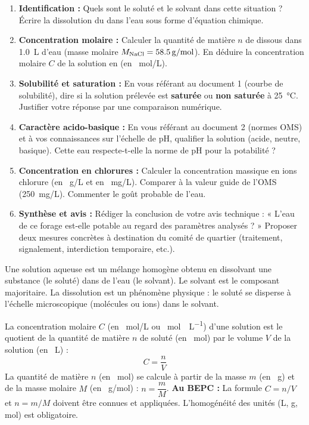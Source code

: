 \documentclass[11pt]{article}
\newcommand{\cle}[1]{{\popxbold\color{popdark}#1}}
\newcounter{popsec}
\newcounter{popsub}
\newcommand{\courssub}[1]{%
  \stepcounter{popsub}%
  \par\vspace{9pt}\noindent{\popxbold\fontsize{11.5}{13}\selectfont\color{popink}{\color{poporange}\thepopsec.\thepopsub}\hspace{6pt}#1}\par\nopagebreak\vspace{4pt}
}
\begin{document}
\begin{enumerate}
    \item \textbf{Identification :} Quels sont le soluté et le solvant dans cette situation ? Écrire la dissolution du  dans l'eau sous forme d'équation chimique.
    \item \textbf{Concentration molaire :} Calculer la quantité de matière $n$ de  dissous dans \SI{1,0}{L} d'eau (masse molaire $M_{\ce{NaCl}} = \SI{58,5}{g/mol}$). En déduire la concentration molaire $C$ de la solution en  (en \SI{}{mol/L}).
    \item \textbf{Solubilité et saturation :} En vous référant au document 1 (courbe de solubilité), dire si la solution prélevée est \textbf{saturée} ou \textbf{non saturée} à \SI{25}{\celsius}. Justifier votre réponse par une comparaison numérique.
    \item \textbf{Caractère acido-basique :} En vous référant au document 2 (normes OMS) et à vos connaissances sur l'échelle de pH, qualifier la solution (acide, neutre, basique). Cette eau respecte-t-elle la norme de pH pour la potabilité ?
    \item \textbf{Concentration en chlorures :} Calculer la concentration massique en ions chlorure  (en \SI{}{g/L} et en \SI{}{mg/L}). Comparer à la valeur guide de l'OMS (\SI{250}{mg/L}). Commenter le goût probable de l'eau.
    \item \textbf{Synthèse et avis :} Rédiger la conclusion de votre avis technique : « L'eau de ce forage est-elle potable au regard des paramètres analysés ? » Proposer deux mesures concrètes à destination du comité de quartier (traitement, signalement, interdiction temporaire, etc.).
\end{enumerate}

\courssub{Ressources à mobiliser}

\begin{definition}
Une \cle{solution aqueuse} est un mélange homogène obtenu en dissolvant une substance (le \cle{soluté}) dans de l'eau (le \cle{solvant}). Le solvant est le composant majoritaire. La dissolution est un phénomène physique : le soluté se disperse à l'échelle microscopique (molécules ou ions) dans le solvant.
\end{definition}

\begin{propriete}
La concentration molaire $C$ (en \SI{}{mol/L} ou \SI{}{mol\cdot L^{-1}}) d'une solution est le quotient de la quantité de matière $n$ de soluté (en \SI{}{mol}) par le volume $V$ de la solution (en \SI{}{L}) :
\[ C = \frac{n}{V} \]
La quantité de matière $n$ (en \SI{}{mol}) se calcule à partir de la masse $m$ (en \SI{}{g}) et de la masse molaire $M$ (en \SI{}{g/mol}) : $n = \dfrac{m}{M}$.
\textbf{Au BEPC :} La formule $C = n/V$ et $n = m/M$ doivent être connues et appliquées. L'homogénéité des unités (L, g, mol) est obligatoire.
\end{propriete}
\end{document}
